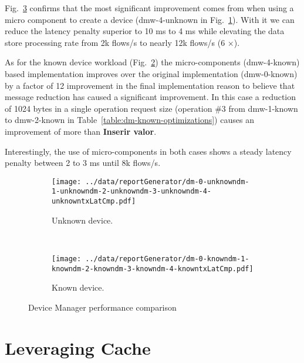 Fig.~\ref{fig:dm:performance} confirms that the most significant improvement comes from when using a micro component to create a device (dmw-4-unknown in Fig.~\ref{fig:dm:comparison:unknown}). 
With it we can reduce the latency penalty superior to 10 ms to  4 ms while elevating the data store processing rate from 2k flows/s to nearly 12k flows/s (6 $\times$).

As for the known device workload (Fig.~\ref{fig:dm:comparison:known}) the micro-components (dmw-4-known) based implementation improves over the original implementation (dmw-0-known) by a factor of 12  improvement in the final implementation 
reason to believe that message reduction has caused a significant improvement. In this case a reduction of 1024 bytes in a single operation request size (operation \#3 from dmw-1-known to dmw-2-known in Table~\ref{table:dm-known-optimizations}) causes an improvement of more than \textbf{Inserir valor}. 

Interestingly, the use of micro-components in both cases shows a steady latency penalty between 2 to 3 ms  until 8k flows/s. 

\begin{figure}[ht]
  \centering
  \begin{subfigure}[b]{0.5\textwidth}
                \centering
                \texttt{[image: ../data/reportGenerator/dm-0-unknowndm-1-unknowndm-2-unknowndm-3-unknowndm-4-unknowntxLatCmp.pdf]}
                \caption{Unknown device.}
                \label{fig:dm:comparison:unknown}

        \end{subfigure}%
        ~
        \begin{subfigure}[b]{0.5\textwidth}
                \centering
                \texttt{[image: ../data/reportGenerator/dm-0-knowndm-1-knowndm-2-knowndm-3-knowndm-4-knowntxLatCmp.pdf]}
                \caption{Known device.}
                \label{fig:dm:comparison:known}
        \end{subfigure}
        \caption[Device Manager performance comparison]{Device Manager performance comparison}
        \label{fig:dm:performance}
\end{figure}


\section{Leveraging Cache}

